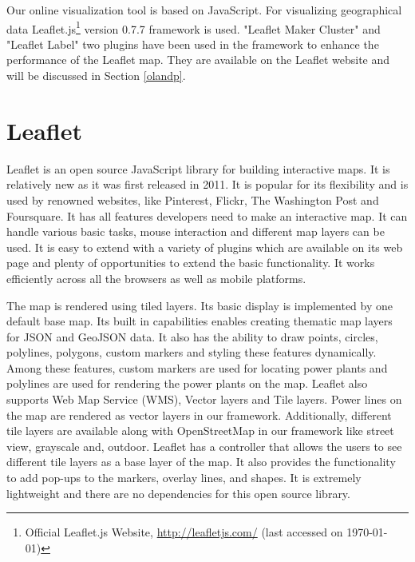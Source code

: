 Our online visualization tool is based on JavaScript. For visualizing geographical data Leaflet.js\footnote{Official Leaflet.js Website, \url{http://leafletjs.com/} (last accessed on \today)} version 0.7.7 framework is used. "Leaflet Maker Cluster" and "Leaflet Label" two plugins have been used in the framework to enhance the performance of the Leaflet map. They are available on the Leaflet website and will be discussed in Section \ref{olandp}.


\section{Leaflet}

Leaflet is an open source JavaScript library for building interactive maps. It is relatively new as it was first released in 2011. It is popular for its flexibility and is used by renowned websites, like Pinterest, Flickr, The Washington Post and Foursquare. It has all features developers need to make an interactive map. It can handle various basic tasks, mouse interaction and different map layers can be used. It is easy to extend with a variety of plugins which are available on its web page and plenty of opportunities to extend the basic functionality. It works efficiently across all the browsers as well as mobile platforms.

The map is rendered using tiled layers. Its basic display is implemented by one default base map. Its built in capabilities enables creating thematic map layers for JSON and GeoJSON data. It also has the ability to draw points, circles, polylines, polygons, custom markers and styling these features dynamically. Among these features, custom markers are used for locating power plants and polylines are used for rendering the power plants on the map. Leaflet also supports Web Map Service (WMS), Vector layers and Tile layers. Power lines on the map are rendered as vector layers in our framework. Additionally, different tile layers are available along with OpenStreetMap in our framework like street view, grayscale and, outdoor. Leaflet has a controller that allows the users to see different tile layers as a base layer of the map. It also provides the functionality to add pop-ups to the markers, overlay lines, and shapes. It is extremely lightweight and there are no dependencies for this open source library. 

